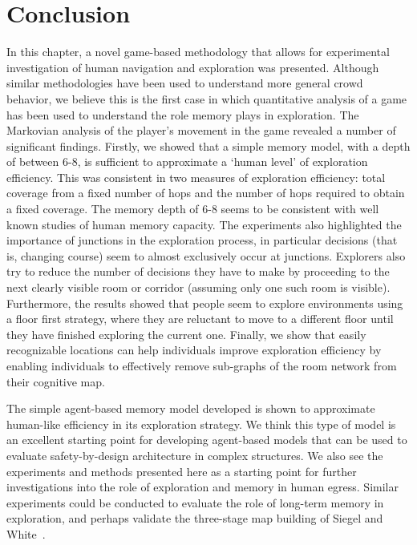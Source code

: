 \section{Conclusion} %
\label{sec:conclusion}

In this chapter, a novel game-based methodology that allows for experimental investigation of human navigation and exploration was presented. Although similar methodologies have been used to understand more general crowd behavior, we believe this is the first case in which quantitative analysis of a game has been used to understand the role memory plays in exploration. The Markovian analysis of the player's movement in the game revealed a number of significant findings. Firstly, we showed that a simple memory model, with a depth of between 6-8, is sufficient to approximate a `human level' of exploration efficiency. This was consistent in two measures of exploration efficiency: total coverage from a fixed number of hops and the number of hops required to obtain a fixed coverage. The memory depth of 6-8 seems to be consistent with well known studies of human memory capacity. The experiments also highlighted the importance of junctions in the exploration process, in particular decisions (that is, changing course) seem to almost exclusively occur at junctions. Explorers also try to reduce the number of decisions they have to make by proceeding to the next clearly visible room or corridor (assuming only one such room is visible). Furthermore, the results showed that people seem to explore environments using a floor first strategy, where they are reluctant to move to a different floor until they have finished exploring the current one. Finally, we show that easily recognizable locations can help individuals improve exploration efficiency by enabling individuals to effectively remove sub-graphs of the room network from their cognitive map.

The simple agent-based memory model developed is shown to approximate human-like efficiency in its exploration strategy. We think this type of model is an excellent starting point for developing agent-based models that can be used to evaluate safety-by-design architecture in complex structures. We also see the experiments and methods presented here as a starting point for further investigations into the role of exploration and memory in human egress. Similar experiments could be conducted to evaluate the role of long-term memory in exploration, and perhaps validate the three-stage map building of Siegel and White~\cite{Siegel19759}.



